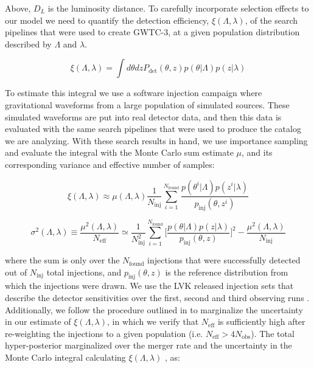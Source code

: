 \noindent Above, $D_L$ is the luminosity distance. To carefully incorporate selection effects to our model we need to quantify the detection efficiency,
$\xi(\Lambda, \lambda)$, of the search pipelines that were used to create GWTC-3, at a given population distribution described by $\Lambda$ and $\lambda$.
 
\begin{equation}
     \xi(\Lambda, \lambda) = \int d\theta dz P_\mathrm{det}(\theta, z)p(\theta | \Lambda) p(z | \lambda)
\end{equation}
 
\noindent
To estimate this integral we use a software injection campaign where gravitational waveforms from a large population of simulated sources. 
These simulated waveforms are put into real detector data, and then this data is evaluated with the same search pipelines that were used to 
produce the catalog we are analyzing. With these search results in hand, we use importance sampling and evaluate the integral 
with the Monte Carlo sum estimate $\mu$, and its corresponding variance and effective number of samples:

\begin{equation} \label{xi}
     \xi(\Lambda, \lambda) \approx \mu(\Lambda, \lambda) \frac{1}{N_\mathrm{inj}} \sum_{i=1}^{N_\mathrm{found}} \frac{p(\theta^i | \Lambda) p(z^i | \lambda)}{p_\mathrm{inj}(\theta, z^i)}
\end{equation}

\begin{equation}
    \sigma^2(\Lambda, \lambda) \equiv \frac{\mu^2(\Lambda, \lambda)}{N_\mathrm{eff}} \simeq \frac{1}{N^2_\mathrm{inj}} \sum_{i=1}^{N_\mathrm{found}} \bigg[\frac{p(\theta | \Lambda) p(z | \lambda)}{p_\mathrm{inj}(\theta, z)}\bigg]^2 - \frac{\mu^2(\Lambda, \lambda)}{N_\mathrm{inj}}
\end{equation}

\noindent
where the sum is only over the $N_\mathrm{found}$ injections that were successfully detected out of $N_\mathrm{inj}$ total injections, 
and $p_\mathrm{inj}(\theta, z)$ is the reference distribution from which the injections were drawn. We use the LVK released injection sets that describe the 
detector sensitivities over the first, second and third observing runs \citep{o1o2o3_injection_sets}. Additionally, we follow the procedure 
outlined in \citet{Farr_2019} to marginalize the uncertainty in our estimate of $\xi(\Lambda, \lambda)$, in which we verify that $N_\mathrm{eff}$ is 
sufficiently high after re-weighting the injections to a given population (i.e. $N_\mathrm{eff} > 4N_\mathrm{obs}$). 
The total hyper-posterior marginalized over the merger rate and the uncertainty in the Monte Carlo integral calculating $\xi(\Lambda, \lambda)$ \citep{Farr_2019}, as:

